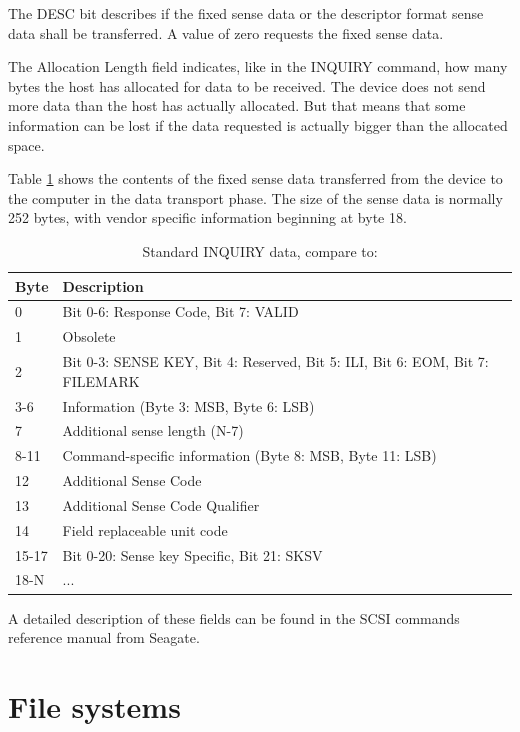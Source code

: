 \newpage

The DESC bit describes if the fixed sense data or the descriptor format sense data shall be transferred. A value of zero requests the fixed sense data\cite{scsi_seagate}.

The Allocation Length field indicates, like in the INQUIRY command, how many bytes the host has allocated for data to be received. The device does not send more data than the host has actually allocated. But that means that some information can be lost if the data requested is actually bigger than the allocated space.

Table \ref{table:sense_data} shows the contents of the fixed sense data transferred from the device to the computer in the data transport phase. The size of the sense data is normally 252 bytes, with vendor specific information beginning at byte 18.

\begin{table}[ht]
\caption{Standard INQUIRY data, compare to: \cite{usb_ms_jan, scsi_seagate}}
\centering
\begin{tabular}{|l|l|}
\hline\hline
\textbf{Byte} & \textbf{Description}\\ \hline
0 & Bit 0-6: Response Code, Bit 7: VALID \\ \hline
1 & Obsolete \\ \hline
2 & Bit 0-3: SENSE KEY, Bit 4: Reserved, Bit 5: ILI, Bit 6: EOM, Bit 7:  FILEMARK \\ \hline
3-6 & Information (Byte 3: MSB, Byte 6: LSB) \\ \hline
7 & Additional sense length (N-7) \\ \hline
8-11 & Command-specific information (Byte 8: MSB, Byte 11: LSB) \\ \hline
12 & Additional Sense Code \\ \hline
13 & Additional Sense Code Qualifier \\ \hline
14 & Field replaceable unit code \\ \hline
15-17 & Bit 0-20: Sense key Specific, Bit 21: SKSV \\ \hline
18-N & ... \\ \hline
\end{tabular}
\label{table:sense_data}
\end{table}

A detailed description of these fields can be found in the SCSI commands reference manual from Seagate\cite{scsi_seagate}.

\chapter{File systems}

